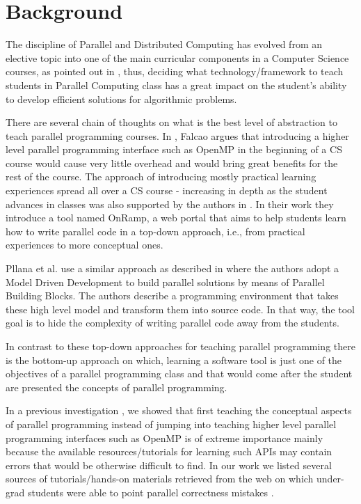 \section{Background}
\label{sec:background}


The discipline of Parallel and Distributed Computing has evolved from an
elective topic into one of the main curricular components in a Computer Science
courses, as pointed out in \cite{acmcurricula}, thus, deciding what
technology/framework to teach students in Parallel Computing class has a great
impact on the student's ability to develop efficient solutions for algorithmic
problems. 

There are several chain of thoughts on what is the best level of abstraction to
teach parallel programming courses. In \cite{6565518}, Falcao argues that
introducing a higher level parallel programming interface such as OpenMP in the
beginning of a CS course would cause very little overhead and would bring
great benefits for the rest of the course. The approach of introducing mostly
practical learning experiences spread all over a CS course - increasing in
depth as the student advances in classes was also supported by the authors in
\cite{FOLEY2017138}. In their work they introduce a tool named OnRamp, a web
portal that aims to help students learn how to write parallel code in a
top-down approach, i.e., from practical experiences to more conceptual ones.

Pllana et al. use a similar approach as described in \cite{Pllana:2009} where
the authors adopt a Model Driven Development to build parallel solutions by
means of Parallel Building Blocks. The authors describe a programming
environment that takes these high level model and transform them into source
code. In that way, the tool goal is to hide the complexity of writing parallel
code away from the students.

In contrast to these top-down approaches for teaching parallel programming
there is the bottom-up approach on which, learning a software tool is just one
of the objectives of a parallel programming class and that would come after the
student are presented the concepts of parallel programming.

In a previous investigation \cite{goncalves:OpenMPNotEasy}, we showed that
first teaching the conceptual aspects of parallel programming instead of
jumping into teaching higher level parallel programming interfaces such as
OpenMP is of extreme importance mainly because the available
resources/tutorials for learning such APIs may contain errors that would be
otherwise difficult to find. In our work we listed several sources of
tutorials/hands-on materials retrieved from the web on which under-grad
students were able to point parallel correctness mistakes
\cite{SuB:2005:CMO:1892830.1892863}.

